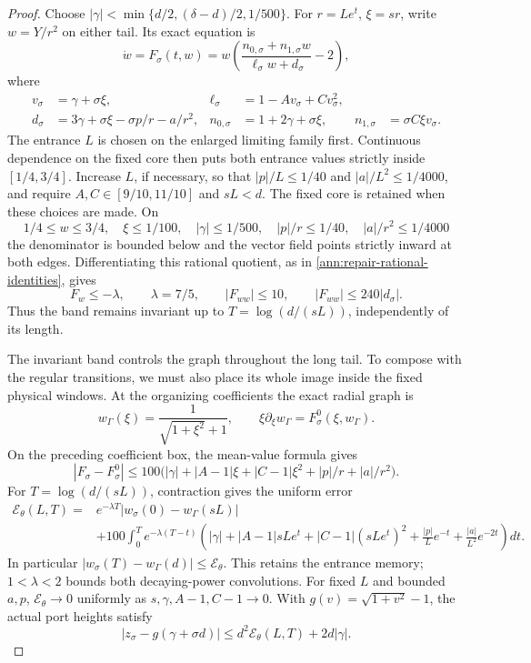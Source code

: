 \begin{proof}
Choose \(|\gamma|<\min\{d/2,(\delta-d)/2,1/500\}\).
For \(r=Le^t\), \(\xi=sr\), write \(w=Y/r^2\) on either tail.
Its exact equation is
\[
 \dot w=F_\sigma(t,w)
 =w\left(\frac{n_{0,\sigma}+n_{1,\sigma}w}
                   {\ell_\sigma w+d_\sigma}-2\right),
\]
where
\[
\begin{aligned}
 v_\sigma&=\gamma+\sigma\xi,
 &\ell_\sigma&=1-Av_\sigma+Cv_\sigma^2,\\
 d_\sigma&=3\gamma+\sigma\xi-\sigma p/r-a/r^2,
 &n_{0,\sigma}&=1+2\gamma+\sigma\xi,
 &n_{1,\sigma}&=\sigma C\xi v_\sigma.
\end{aligned}
\]
The entrance \(L\) is chosen on the enlarged limiting family first.
Continuous dependence on the fixed core then puts both entrance
values strictly inside \([1/4,3/4]\). Increase \(L\), if necessary,
so that \(|p|/L\le1/40\) and \(|a|/L^2\le1/4000\), and require
\(A,C\in[9/10,11/10]\) and \(sL<d\). The fixed core is retained
when these choices are made. On
\[
 1/4\le w\le3/4,\quad \xi\le1/100,
 \quad |\gamma|\le1/500,
 \quad |p|/r\le1/40,
 \quad |a|/r^2\le1/4000
\]
the denominator is bounded below and the vector field points strictly
inward at both edges. Differentiating this rational quotient, as in
\eqref{ann:repair-rational-identities}, gives
\begin{equation}\label{ann:p0-tail-envelope}
 F_w\le-\lambda,\qquad \lambda=7/5,
 \qquad |F_{ww}|\le10,
 \qquad |F_{ww}|\le240|d_\sigma|.
\end{equation}
Thus the band remains invariant up to
\(T=\log(d/(sL))\), independently of its length.

The invariant band controls the graph throughout the long tail. To
compose with the regular transitions, we must also place its whole image
inside the fixed physical windows.
At the organizing coefficients the exact radial graph is
\[
 w_\Gamma(\xi)=\frac1{\sqrt{1+\xi^2}+1},\qquad
 \xi\partial_\xi w_\Gamma=F^0_\sigma(\xi,w_\Gamma).
\]
On the preceding coefficient box, the mean-value formula gives
\[
 |F_\sigma-F^0_\sigma|
 \le100\bigl(|\gamma|+|A-1|\xi+|C-1|\xi^2
                         +|p|/r+|a|/r^2\bigr).
\]
For \(T=\log(d/(sL))\), contraction gives the uniform error
\[
 \begin{split}
 \mathcal E_\theta(L,T)={}&e^{-\lambda T}
       |w_\sigma(0)-w_\Gamma(sL)|\\
 &+100\int_0^T e^{-\lambda(T-t)}
 \left(|\gamma|+|A-1|sLe^t+|C-1|(sLe^t)^2
       +\frac{|p|}{L}e^{-t}+\frac{|a|}{L^2}e^{-2t}\right)dt.
 \end{split}
\]
In particular \(|w_\sigma(T)-w_\Gamma(d)|\le\mathcal E_\theta\).
This retains the entrance memory; \(1<\lambda<2\) bounds both
decaying-power convolutions. For fixed \(L\) and bounded \(a,p\),
\(\mathcal E_\theta\to0\) uniformly as
\(s,\gamma,A-1,C-1\to0\).
With \(g(v)=\sqrt{1+v^2}-1\), the actual port heights satisfy
\[
 |z_\sigma-g(\gamma+\sigma d)|
       \le d^2\mathcal E_\theta(L,T)+2d|\gamma|.
\]


\end{proof}
